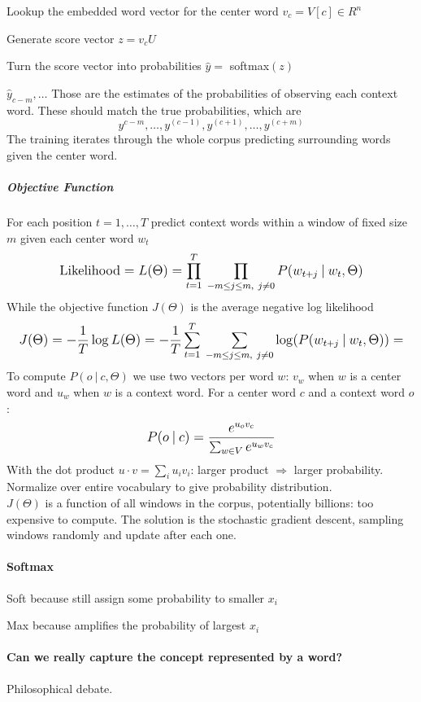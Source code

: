 \documentclass[10pt]{report}
\begin{document}
\pagebreak
\begin{list}{}{Procedure}
	\item Lookup the embedded word vector for the center word $v_c = V[c] \in R^n$
	\item Generate score vector $z = v_cU$
	\item Turn the score vector into probabilities $\hat{y} =$ softmax$(z)$
\end{list}
$\hat{y}_{c-m},\ldots$ Those are the estimates of the probabilities of observing each context word. These should match the true probabilities, which are $$y^{c-m},\ldots, y^{(c-1)}, y^{(c+1)}, \ldots, y^{(c+m)}$$
The training iterates through the whole corpus predicting surrounding words given the center word.
\subparagraph{Objective Function} For each position $t=1,\ldots,T$ predict context words within a window of fixed size $m$ given each center word $w_t$ $$\mathlarger{\hbox{Likelihood} = L(\Theta) = \prod_{t=1}^T\:\prod_{-m\leq j\leq m,\:\:j\neq 0} P(w_{t+j}\:|\:w_t,\Theta)}$$
While the objective function $J(\Theta)$ is the average negative log likelihood $$\mathlarger{J(\Theta) = -\frac{1}{T}\log L(\Theta) = -\frac{1}{T}\sum_{t=1}^T\:\sum_{-m\leq j\leq m,\:\:j\neq 0} \log(P(w_{t+j}\:|\:w_t,\Theta))=}$$
To compute $P(o\:|\:c, \Theta)$ we use two vectors per word $w$: $v_w$ when $w$ is a center word and $u_w$ when $w$ is a context word. For a center word $c$ and a context word $o$:
$$\mathlarger{P(o\:|\:c) = \frac{e^{u_o v_c}}{\sum_{w\in V} e^{u_w v_c}}}$$
With the dot product $u\cdot v = \sum_i u_iv_i$: larger product $\Rightarrow$ larger probability. Normalize over entire vocabulary to give probability distribution.\\
$J(\Theta)$ is a function of all windows in the corpus, potentially billions: too expensive to compute. The solution is the stochastic gradient descent, sampling windows randomly and update after each one.
\paragraph{Softmax}\begin{list}{}{}
	\item Soft because still assign some probability to smaller $x_i$
	\item Max because amplifies the probability of largest $x_i$
\end{list}
\paragraph{Can we really capture the concept represented by a word?} Philosophical debate.
\end{document}
